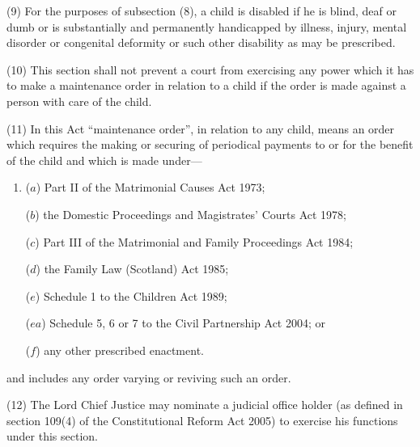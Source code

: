 \documentclass[a4paper]{article}
\begin{document}
(9) For the purposes of subsection (8), a child is disabled if he is blind, deaf or
dumb or is substantially and permanently handicapped by illness, injury, mental
disorder or congenital deformity or such other disability as may be prescribed.

(10) This section shall not prevent a court from exercising any power which it
has to make a maintenance order in relation to a child if the order is made against
a person with care of the child.

(11) In this Act “maintenance order”, in relation to any child, means an order
which requires the making or securing of periodical payments to or for the benefit
of the child and which is made under---
\begin{enumerate}\item[]
($a$)
Part II of the Matrimonial Causes Act 1973;

($b$)
the Domestic Proceedings and Magistrates’ Courts Act 1978;

($c$)
Part III of the Matrimonial and Family Proceedings Act 1984;

($d$)
the Family Law (Scotland) Act 1985;

($e$)
Schedule 1 to the Children Act 1989;

($ea$)
Schedule 5, 6 or 7 to the Civil Partnership Act 2004; or

($f$)
any other prescribed enactment.
\end{enumerate}
and includes any order varying or reviving such an order.

(12)
The Lord Chief Justice may nominate a judicial office holder (as defined in
section 109(4) of the Constitutional Reform Act 2005) to exercise his functions under
this section.
\end{document}
